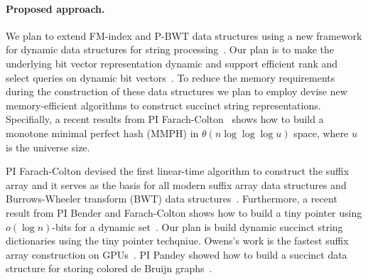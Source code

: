 \paragraph{Proposed approach.}

We plan to extend FM-index and P-BWT data structures using a new framework for dynamic data structures for string processing~\cite{Nicola17,Farzan2011}. Our plan is to make the underlying bit vector representation dynamic and support efficient rank and select queries on dynamic bit vectors~\cite{Raman2001}.
To reduce the memory requirements during the construction of these data structures we plan to employ devise new memory-efficient algorithms to construct succinct string representations. Specifially, a recent results from PI Farach-Colton~\cite{Assadi2023} shows how to build a monotone minimal perfect hash (MMPH) in $\theta(n \log{\log{\log u}})$ space, where $u$ is the universe size.


PI Farach-Colton devised the first linear-time algorithm to construct the suffix array and it serves as the basis for all modern suffix array data structures and Burrows-Wheeler transform (BWT) data structures~\cite{Farach97,Ambainis97}. Furthermore, a recent result from PI Bender and Farach-Colton shows how to build a tiny pointer using $o(\log{n})$-bits for a dynamic set~\cite{Bender2023}. Our plan is build dynamic succinct string dictionaries using the tiny pointer techqniue.
Owens's work is the fastest suffix array construction on GPUs~\cite{Wang:2016:FPS}. PI Pandey showed how to build a succinct data structure for storing colored de Bruijn graphs~\cite{almodaresi2017rainbowfish}.
